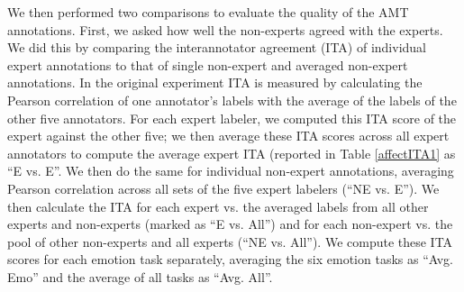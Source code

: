 \documentclass[11pt]{article}
\begin{document}

We then performed two comparisons to evaluate the quality of the AMT annotations.
First, we  asked how well the non-experts agreed with the experts.
We did this by comparing the interannotator agreement (ITA) of
individual expert annotations to that of single non-expert and
averaged non-expert annotations.  In the original experiment ITA
is measured by calculating the Pearson correlation of one annotator's
labels with the average of the labels of the other five annotators. For each expert labeler, we computed this ITA score of the expert against the other five;
we then average these ITA scores across all expert annotators to compute the average expert ITA  (reported in Table \ref{affectITA1} as ``E vs. E''.   We then do the same for individual non-expert annotations, averaging Pearson correlation across all sets of the five expert labelers (``NE vs. E'').  We then calculate the ITA for each expert vs. the averaged labels from all other experts and non-experts (marked as ``E vs. All'') and for each non-expert vs. the pool of other non-experts and all experts (``NE vs. All'').  We compute these ITA scores for each emotion task separately, averaging the six emotion tasks as ``Avg. Emo'' and the average of all tasks as ``Avg. All''.

\end{document}
